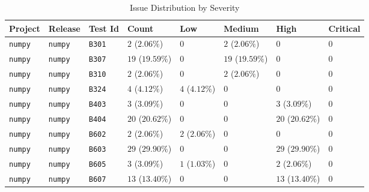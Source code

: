 \begin{table}
\caption{Issue Distribution by Severity}
\label{tab:issue-distribution}
\begin{tabular}{llllllll}
\toprule
Project & Release & Test Id & Count & Low & Medium & High & Critical \\
\midrule
\texttt{numpy} & \texttt{numpy} & \texttt{B301} & $2$ ($2.06\%$) & $0$ & $2$ ($2.06\%$) & $0$ & $0$ \\
\texttt{numpy} & \texttt{numpy} & \texttt{B307} & $19$ ($19.59\%$) & $0$ & $19$ ($19.59\%$) & $0$ & $0$ \\
\texttt{numpy} & \texttt{numpy} & \texttt{B310} & $2$ ($2.06\%$) & $0$ & $2$ ($2.06\%$) & $0$ & $0$ \\
\texttt{numpy} & \texttt{numpy} & \texttt{B324} & $4$ ($4.12\%$) & $4$ ($4.12\%$) & $0$ & $0$ & $0$ \\
\texttt{numpy} & \texttt{numpy} & \texttt{B403} & $3$ ($3.09\%$) & $0$ & $0$ & $3$ ($3.09\%$) & $0$ \\
\texttt{numpy} & \texttt{numpy} & \texttt{B404} & $20$ ($20.62\%$) & $0$ & $0$ & $20$ ($20.62\%$) & $0$ \\
\texttt{numpy} & \texttt{numpy} & \texttt{B602} & $2$ ($2.06\%$) & $2$ ($2.06\%$) & $0$ & $0$ & $0$ \\
\texttt{numpy} & \texttt{numpy} & \texttt{B603} & $29$ ($29.90\%$) & $0$ & $0$ & $29$ ($29.90\%$) & $0$ \\
\texttt{numpy} & \texttt{numpy} & \texttt{B605} & $3$ ($3.09\%$) & $1$ ($1.03\%$) & $0$ & $2$ ($2.06\%$) & $0$ \\
\texttt{numpy} & \texttt{numpy} & \texttt{B607} & $13$ ($13.40\%$) & $0$ & $0$ & $13$ ($13.40\%$) & $0$ \\
\bottomrule
\end{tabular}
\end{table}
